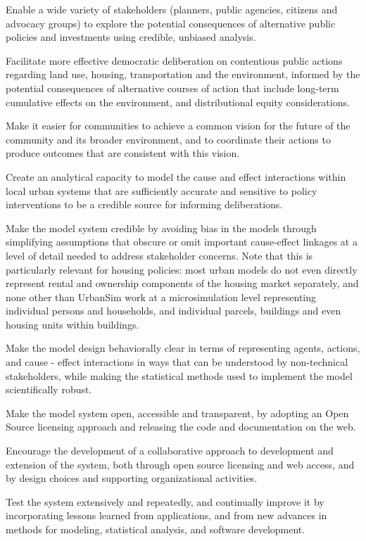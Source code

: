 \bigskip
\squishlist
\item Enable a wide variety of stakeholders (planners, public agencies, citizens and advocacy groups) to explore the potential consequences of alternative public policies and investments using credible, unbiased analysis.
\item Facilitate more effective democratic deliberation on contentious public actions regarding land use, housing, transportation and the environment, informed by the potential consequences of alternative courses of action that include long-term cumulative effects on the environment, and distributional equity considerations.
\item Make it easier for communities to achieve a common vision for the future of the community and its broader environment, and to coordinate their actions to produce outcomes that are consistent with this vision.
\item Create an analytical capacity to model the cause and effect interactions within local urban systems that are sufficiently accurate and sensitive to policy interventions to be a credible source for informing deliberations.
\item Make the model system credible by avoiding bias in the models through simplifying assumptions that obscure or omit important cause-effect linkages at a level of detail needed to address stakeholder concerns. Note that this is particularly relevant for housing policies: most urban models do not even directly represent rental and ownership components of the housing market separately, and none other than UrbanSim work at a microsimulation level representing individual persons and households, and individual parcels, buildings and even housing units within buildings.
\item Make the model design behaviorally clear in terms of representing agents, actions, and cause - effect interactions in ways that can be understood by non-technical stakeholders, while making the statistical methods used to implement the model scientifically robust.
\item Make the model system open, accessible and transparent, by adopting an Open Source licensing approach and releasing the code and documentation on the web.
\item Encourage the development of a collaborative approach to development and extension of the system, both through open source licensing and web access, and by design choices and supporting organizational activities.
\item Test the system extensively and repeatedly, and continually improve it by incorporating lessons learned from applications, and from new advances in methods for modeling, statistical analysis, and software development.
\squishend

